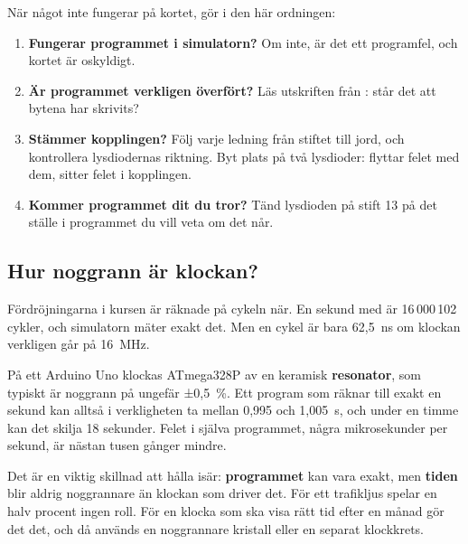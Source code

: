När något inte fungerar på kortet, gör i den här ordningen:
\begin{enumerate}
  \item \textbf{Fungerar programmet i simulatorn?} Om inte, är det ett programfel, och kortet är
    oskyldigt.
  \item \textbf{Är programmet verkligen överfört?} Läs utskriften från : står det att
    bytena har skrivits?
  \item \textbf{Stämmer kopplingen?} Följ varje ledning från stiftet till jord, och kontrollera
    lysdiodernas riktning. Byt plats på två lysdioder: flyttar felet med dem, sitter felet i
    kopplingen.
  \item \textbf{Kommer programmet dit du tror?} Tänd lysdioden på stift 13 på det ställe i
    programmet du vill veta om det når.
\end{enumerate}

\subsection{Hur noggrann är klockan?}
\label{c11:a7}
Fördröjningarna i kursen är räknade på cykeln när. En sekund med  är
16\,000\,102 cykler, och simulatorn mäter exakt det. Men en cykel är bara 62,5~ns om klockan
verkligen går på 16~MHz.

På ett Arduino Uno klockas ATmega328P av en keramisk \textbf{resonator}, som typiskt är noggrann på
ungefär ±0,5~\%. Ett program som räknar till exakt en sekund kan alltså i verkligheten ta mellan
0,995 och 1,005~s, och under en timme kan det skilja 18 sekunder. Felet i själva programmet, några
mikrosekunder per sekund, är nästan tusen gånger mindre.

Det är en viktig skillnad att hålla isär: \textbf{programmet} kan vara exakt, men \textbf{tiden}
blir aldrig noggrannare än klockan som driver det. För ett trafikljus spelar en halv procent ingen
roll. För en klocka som ska visa rätt tid efter en månad gör det det, och då används en noggrannare
kristall eller en separat klockkrets.
